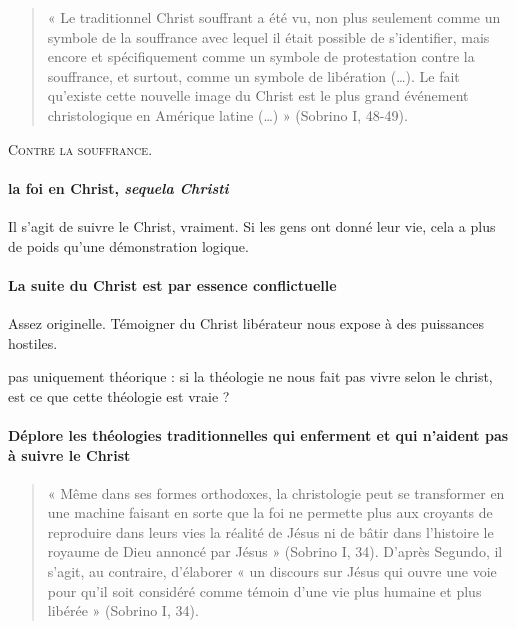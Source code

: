     \begin{quote}
        « Le traditionnel Christ souffrant a été vu, non plus seulement comme un symbole de la souffrance
avec lequel il était possible de s’identifier, mais encore et spécifiquement comme un symbole de
protestation contre la souffrance, et surtout, comme un symbole de libération (…). Le fait qu’existe
cette nouvelle image du Christ est le plus grand événement christologique en Amérique latine (…) »
(Sobrino I, 48-49).
    \end{quote}

 \textsc{Contre la souffrance}.

\paragraph{la foi en Christ, \textit{sequela Christi}} Il s'agit de suivre le Christ, vraiment. Si les gens ont donné leur vie, cela a plus de poids qu'une démonstration logique. 


\paragraph{La suite du Christ est par essence conflictuelle} Assez originelle. Témoigner du Christ libérateur nous expose à des puissances hostiles.

pas uniquement théorique : si la théologie ne nous fait pas vivre selon le christ, est ce que cette théologie est vraie ?


\paragraph{Déplore les théologies traditionnelles qui enferment et qui n'aident pas à suivre le Christ}
\begin{quote}
    « Même dans ses formes orthodoxes, la christologie peut se transformer en une machine faisant en
sorte que la foi ne permette plus aux croyants de reproduire dans leurs vies la réalité de Jésus ni de
bâtir dans l’histoire le royaume de Dieu annoncé par Jésus » (Sobrino I, 34). D’après Segundo, il
s’agit, au contraire, d’élaborer « un discours sur Jésus qui ouvre une voie pour qu’il soit considéré
comme témoin d’une vie plus humaine et plus libérée » (Sobrino I, 34).
\end{quote}

